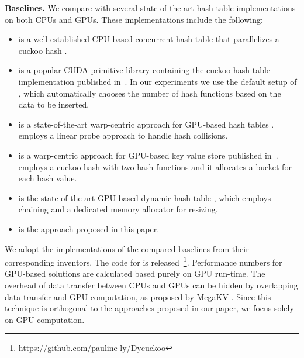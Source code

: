 \vspace{1mm}\noindent\textbf{Baselines.} We compare \voter with several state-of-the-art hash table implementations on both CPUs and GPUs. These implementations include the following:
\begin{itemize}
	\item \chash is a well-established CPU-based concurrent hash table that parallelizes a cuckoo hash \cite{li2014algorithmic}.
	\item \cudpp is a popular CUDA primitive library containing the cuckoo hash table implementation published in~\cite{alcantara2009real}.  
	In our experiments we use the default setup of \cudpp, which automatically chooses the number of hash functions based on the data to be inserted.
	\item \warp is a state-of-the-art warp-centric approach for GPU-based hash tables \cite{junger2018warpdrive}. \warp employs a linear probe approach to handle hash collisions.
	\item \megakv is a warp-centric approach for GPU-based key value store published in~\cite{zhang2015mega}. \megakv employs a cuckoo hash with two hash functions and
	it allocates a bucket for each hash value. 
	\item \slab is the state-of-the-art GPU-based dynamic hash table \cite{ashkiani2018dynamic}, which employs chaining and a dedicated memory allocator for resizing.
	\item \voter is the approach proposed in this paper. 
\end{itemize}
We adopt the implementations of the compared baselines from their corresponding inventors.
The code for \voter is released~\footnote{https://github.com/pauline-ly/Dycuckoo}. 
Performance numbers for GPU-based solutions are calculated based purely on GPU run-time. The overhead of data transfer between CPUs and GPUs can be hidden by overlapping data transfer and GPU computation, as proposed by MegaKV \cite{zhang2015mega}. Since this technique is orthogonal to the approaches proposed in our paper, we focus solely on GPU computation. 


